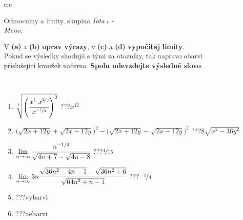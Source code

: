 \documentclass[10pt]{report}
\begin{document}
\newpage
\thispagestyle{empty}
\begin{tabular}{c:c}
\begin{minipage}[c][104.5mm][t]{0.5\linewidth}
\begin{center}
\vspace{7mm}
{\huge Odmocniny a limity, skupina \textit{Iota $\iota$} -}\\[5mm]
\textit{Meno:}\phantom{xxxxxxxxxxxxxxxxxxxxxxxxxxxxxxxxxxxxxxxxxxxxxxxxxxxxxxxxxxxxxxxxx}\\[5mm]
\begin{minipage}{0.95\linewidth}
\begin{center}
V \textbf{(a)} a \textbf{(b)} \textbf{uprav výrazy}, v \textbf{(c)} a \textbf{(d)} \textbf{vypočítaj limity}.\\Pokud se výsledky shodujú s tými za otazníky, tak napravo obarvi\\příslušející kroužek načerno. \textbf{Spolu odevzdejte výsledné slovo}.
\end{center}
\end{minipage}
\\[1mm]
\begin{minipage}{0.79\linewidth}
\begin{center}
\begin{varwidth}{\linewidth}
\begin{enumerate}
\small
\item $\sqrt[1]{\left(\cfrac{x^{1}\;x^{\nicefrac{2}{3}}}{x^{\nicefrac{-7}{3}}}\right)^{3}}$\quad \dotfill\; ???\;\dotfill \quad $x^{12}$
\item {\footnotesize{\scriptsize$\big(\sqrt{2x+12y}+\sqrt{2x-12y}\big)^2-\big(\sqrt{2x+12y}-\sqrt{2x-12y}\big)^2$}\quad \dotfill\; ???\;\dotfill \quad $8\sqrt{x^2-36y^2}$}
\item $\lim\limits_{n\to\infty}\cfrac{n^{-1/2}}{\sqrt{4n+7}-\sqrt{4n-8}}$\quad \dotfill\; ???\;\dotfill \quad $\nicefrac{4}{15}$
\item $\lim\limits_{n\to\infty}3n\cfrac{\sqrt{36n^2-4n-1}-\sqrt{36n^2+6}}{\sqrt{64n^2+n-1}}$\quad \dotfill\; ???\;\dotfill \quad $\nicefrac{-1}{4}$
\item \quad \dotfill\; ???\;\dotfill \quad vybarvi
\item \quad \dotfill\; ???\;\dotfill \quad nebarvi
\end{enumerate}
\end{varwidth}
\end{center}
\end{minipage}
\begin{minipage}{0.20\linewidth}

\end{minipage}
\end{center}
\end{minipage}
\end{tabular}
\end{document}
